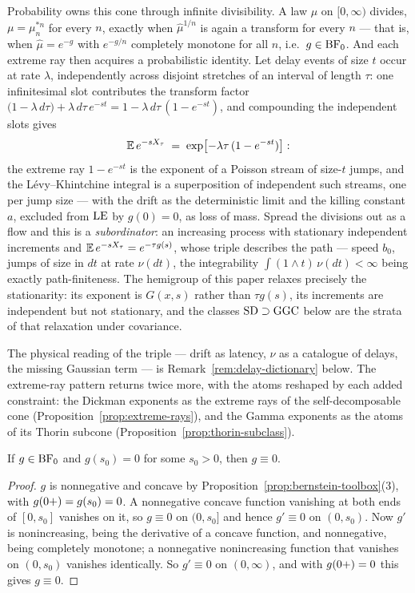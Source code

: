 \begin{remark}
Probability owns this cone through infinite divisibility. A law $\mu$ on $[0,\infty)$
divides, $\mu = \mu_n^{*n}$ for every $n$, exactly when $\hat\mu^{1/n}$ is again a
transform for every $n$ --- that is, when $\hat\mu = e^{-g}$ with $e^{-g/n}$ completely
monotone for all $n$, i.e.\ $g \in \mathrm{BF}_0$. And each extreme ray then acquires a
probabilistic identity. Let delay events of size $t$ occur at rate $\lambda$,
independently across disjoint stretches of an interval of length $\tau$: one
infinitesimal slot contributes the transform factor
$\bigl(1 - \lambda\,d\tau\bigr) + \lambda\,d\tau\,e^{-st}
 = 1 - \lambda\,d\tau\,(1 - e^{-st})$,
and compounding the independent slots gives
\[
  \mathbb{E}\, e^{-sX_\tau} \;=\; \exp\bigl[-\lambda\tau\,(1 - e^{-st})\bigr] :
\]
the extreme ray $1 - e^{-st}$ is the exponent of a Poisson stream of size-$t$ jumps,
and the Lévy--Khintchine integral is a superposition of independent such streams, one
per jump size --- with the drift as the deterministic limit and the killing constant
$a$, excluded from $\mathrm{LE}$ by $g(0) = 0$, as loss of mass. Spread the divisions out as a
flow and this is a \emph{subordinator}: an increasing process with stationary
independent increments and $\mathbb{E}\,e^{-sX_\tau} = e^{-\tau g(s)}$, whose triple describes
the path --- speed $b_0$, jumps of size in $dt$ at rate $\nu(dt)$, the integrability
$\int (1 \wedge t)\,\nu(dt) < \infty$ being exactly path-finiteness. The hemigroup of
this paper relaxes precisely the stationarity: its exponent is $G(x,s)$ rather than
$\tau g(s)$, its increments are independent but not stationary, and the classes
$\mathrm{SD} \supset \mathrm{GGC}$ below are the strata of that relaxation under covariance.

The physical reading of the triple --- drift as latency, $\nu$ as a catalogue of
delays, the missing Gaussian term --- is Remark~\ref{rem:delay-dictionary} below. The
extreme-ray pattern returns twice more, with the atoms reshaped by each added
constraint: the Dickman exponents as the extreme rays of the self-decomposable cone
(Proposition~\ref{prop:extreme-rays}), and the Gamma exponents as the atoms of its
Thorin subcone (Proposition~\ref{prop:thorin-subclass}).
\end{remark}

\begin{lemma}\label{lem:vanishing}
If $g \in \mathrm{BF}_0$ and $g(s_0) = 0$ for some $s_0 > 0$, then $g \equiv 0$.
\end{lemma}

\begin{proof}
$g$ is nonnegative and concave by Proposition~\ref{prop:bernstein-toolbox}(3), with
$g(0{+}) = g(s_0) = 0$. A nonnegative concave function vanishing at both ends of $[0, s_0]$
vanishes on it, so $g \equiv 0$ on $(0, s_0]$ and hence $g' \equiv 0$ on $(0, s_0)$. Now $g'$
is nonincreasing, being the derivative of a concave function, and nonnegative, being
completely monotone; a nonnegative nonincreasing function that vanishes on $(0,s_0)$ vanishes
identically. So $g' \equiv 0$ on $(0,\infty)$, and with $g(0{+}) = 0$ this gives $g \equiv 0$.
\end{proof}

